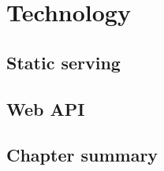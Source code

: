 \chapter{Technology}
\label{chap:Technology}

\section{Static serving}
\label{sec:Static serving}

\section{Web API}
\label{sec:Web API}

\section{Chapter summary}
\label{sec:Chapter summary}
